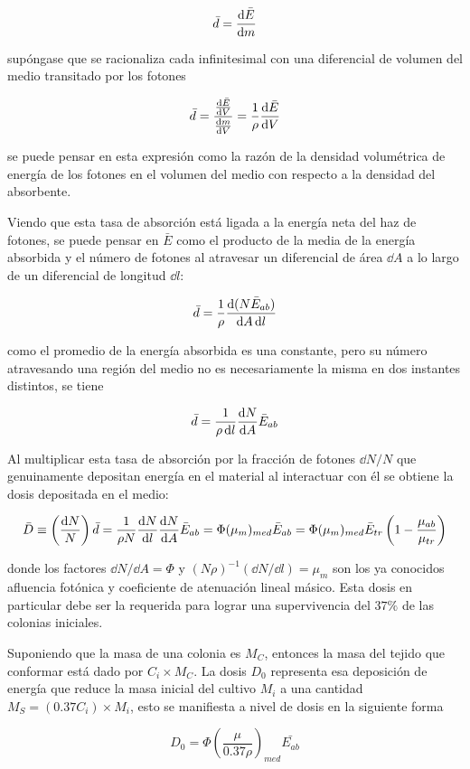 \documentclass[12pt,letterpaper, oneside]{book}
\begin{document}
	$$\bar{d}=\dv{\bar{E}}{m}$$
	
	\noindent supóngase que se racionaliza cada infinitesimal con una diferencial de volumen del medio transitado por los fotones
	
	$$\bar{d}=\frac{\dv{\bar{E}}{V}}{\dv{m}{V}}=\frac{1}{\rho}\dv{\bar{E}}{V}$$
	
	\noindent se puede pensar en esta expresión como la razón de la densidad volumétrica de energía de los fotones en el volumen del medio con respecto a la densidad del absorbente. 
	
	Viendo que esta tasa de absorción está ligada a la energía neta del haz de fotones, se puede pensar en $\bar{E}$ como el producto de la media de la energía absorbida y el número de fotones al atravesar un diferencial de área $\dd{A}$ a lo largo de un diferencial de longitud $\dd{l}$:
	
	$$\bar{d}=\frac{1}{\rho}\dv{(N\bar{E}_{ab})}{A\dd{l}}$$
	
	\noindent como el promedio de la energía absorbida es una constante, pero su número atravesando una región del medio no es necesariamente la misma en dos instantes distintos, se tiene
	
	$$\bar{d}=\frac{1}{\rho\dd{l}}\dv{N}{A}\bar{E}_{ab}$$
	
	Al multiplicar esta tasa de absorción por la fracción de fotones $\dd{N}/N$ que genuinamente depositan energía en el material al interactuar con él se obtiene la dosis depositada en el medio:
	
	$$\bar{D}\equiv \left(\frac{\dd{N}}{N}\right)\bar{d}=\frac{1}{\rho N}\dv{N}{l}\dv{N}{A}\bar{E}_{ab}=\Phi(\mu_m)_{med}\bar{E}_{ab}=\Phi(\mu_m)_{med}\bar{E}_{tr}\left(1-\frac{\mu_{ab}}{\mu_{tr}}\right)$$
	
	\noindent donde los factores $\dd{N}/\dd{A}=\Phi$ y $(N\rho)^{-1}(\dd{N}/\dd{l})=\mu_m$ son los ya conocidos afluencia fotónica y coeficiente de atenuación lineal másico. Esta dosis en particular debe ser la requerida para lograr una supervivencia del $37\%$ de las colonias iniciales.
	
	Suponiendo que la masa de una colonia es $M_C$, entonces la masa del tejido que conformar está dado por $C_i\times M_C$. La dosis $D_0$ representa esa deposición de energía que reduce la masa inicial del cultivo $M_i$ a una cantidad $M_S=(0.37C_i)\times M_i$, esto se manifiesta a nivel de dosis en la siguiente forma
	
	$$D_0=\Phi \left(\frac{\mu}{0.37\rho}\right)_{med}\bar{E_{ab}}$$
	
\end{document}
